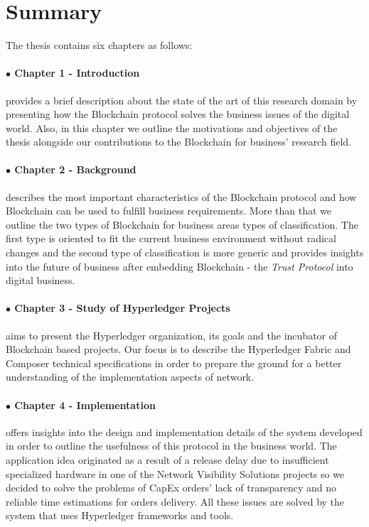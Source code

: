 \section{Summary}
\label{sec:intro-sec4}
The thesis contains six chapters as follows:

\paragraph{$\bullet$ Chapter 1 - Introduction} provides a brief description about the state of the art of this research domain by presenting how the Blockchain protocol solves the business issues of the digital world. Also, in this chapter we outline the motivations and objectives of the thesis alongside our contributions to the Blockchain for business' research field.

\paragraph{$\bullet$ Chapter 2 - Background} describes the most important characteristics of the Blockchain protocol and how Blockchain can be used to fulfill business requirements. More than that we outline the two types of Blockchain for business areas types of classification. The first type is oriented to fit the current business environment without radical changes and the second type of classification is more generic and provides insights into the future of business after embedding Blockchain - the \emph{Trust Protocol} into digital business.

\paragraph{$\bullet$ Chapter 3 - Study of Hyperledger Projects} aims to present the Hyperledger organization, its goals and the incubator of Blockchain based projects. Our focus is to describe the Hyperledger Fabric and Composer technical specifications in order to prepare the ground for a better understanding of  the implementation aspects of {\project} network.  

\paragraph{$\bullet$ Chapter 4 - Implementation} offers insights into the design and implementation details of the {\project} system developed in order to outline the usefulness of this protocol in the business world. The application idea originated as a result of a release delay due to insufficient specialized hardware in one of the Network Visibility Solutions projects so we decided to solve the problems of CapEx orders' lack of transparency and no reliable time estimations for orders delivery. All these issues are solved by the {\project} system that uses Hyperledger frameworks and tools.

